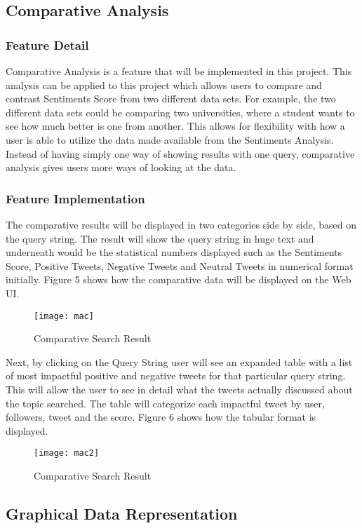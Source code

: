 \documentclass[12pt, titlepage]{article}
\begin{document}
\subsection{Comparative Analysis}
\subsubsection{Feature Detail}
Comparative Analysis is a feature that will be implemented in this project. This analysis can be applied to this project which allows users to compare and contrast Sentiments Score from two different data sets. For example, the two different data sets could be comparing two universities, where a student wants to see how much better is one from another. This allows for flexibility with how a user is able to utilize the data made available from the Sentiments Analysis. Instead of having simply one way of showing results with one query, comparative analysis gives users more ways of looking at the data. \\
\subsubsection{Feature Implementation}
The comparative results will be displayed in two categories side by side, based on the query string. The result will show the query string in huge text and underneath would be the statistical numbers displayed such as the Sentiments Score, Positive Tweets, Negative Tweets and Neutral Tweets in numerical format initially. Figure 5 shows how the comparative data will be displayed on the Web UI. 
\begin{figure}[H]
\centering
\texttt{[image: mac]}
\caption{Comparative Search Result}
\label{fig:Result}
\end{figure}
Next, by clicking on the Query String user will see an expanded table with a list of most impactful positive and negative tweets for that particular query string. This will allow the user to see in detail what the tweets actually discussed about the topic searched. The table will categorize each impactful tweet by user, followers, tweet and the score. Figure 6 shows how the tabular format is displayed.
\begin{figure}[H]
\centering
\texttt{[image: mac2]}
\caption{Comparative Search Result}
\label{fig:Result}
\end{figure}

\subsection{Graphical Data Representation}
\end{document}
